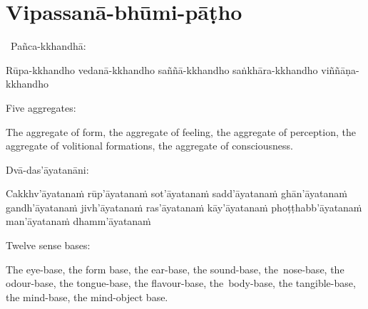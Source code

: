 \suttaRef{[Dhs 1]}



\section{Vipassanā-bhūmi-pāṭho}
\label{vipassana-bhumi-patho}

\begin{pali-hang-continued}
  \anglebracketleft\ \hspace{-0.5mm}Pañca-kkhandhā: \hspace{-0.5mm}\anglebracketright\
  \begin{pali-hang}
    Rūpa-kkhandho vedanā-kkhandho saññā-kkhandho saṅkhāra-kkhandho viññāṇa-kkhandho
  \end{pali-hang}
\end{pali-hang-continued}

\begin{english-verses}
  Five aggregates:
  \begin{english-hangtogether-verses}
    The aggregate of form, the aggregate of feeling, the aggregate of perception, the aggregate of volitional formations, the aggregate of consciousness.
  \end{english-hangtogether-verses}
\end{english-verses}

\suttaRef{[MN 109]}

\begin{pali-hang-continued}
  Dvā-das'āyatanāni:
  \begin{pali-hang}
    Cakkhv'āyatanaṁ rūp'āyatanaṁ sot'āyatanaṁ sadd'āyatanaṁ ghān'āyatanaṁ gandh'āyatanaṁ jivh'āyatanaṁ ras'āyatanaṁ kāy'āyatanaṁ phoṭṭhabb'āyatanaṁ man'āyatanaṁ dhamm'āyatanaṁ
  \end{pali-hang}
\end{pali-hang-continued}

\begin{english-verses}
  Twelve sense bases:
  \begin{english-hangtogether-verses}
    The eye-base, the form base, the ear-base, the sound-base, the~nose-base, the odour-base, the tongue-base, the flavour-base, the~body-base, the tangible-base, the mind-base, the mind-object base.
  \end{english-hangtogether-verses}
\end{english-verses}

